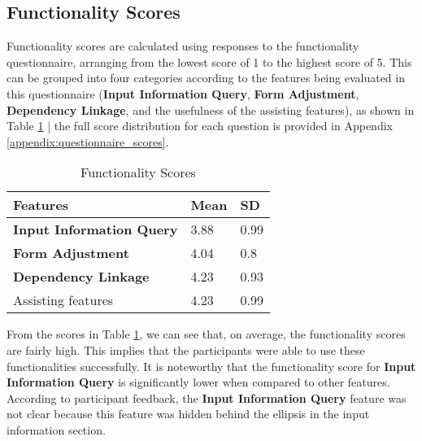 
\subsection{Functionality Scores}
\label{eval:func_scores}
Functionality scores are calculated using responses to the functionality questionnaire, arranging from the lowest score of 1 to the highest score of 5. This can be grouped into four categories according to the features being evaluated in this questionnaire (\textbf{Input Information Query}, \textbf{Form Adjustment}, \textbf{Dependency Linkage}, and the usefulness of the assisting features), as shown in Table \ref{tab:func_scores} | the full score distribution for each question is provided in Appendix \ref{appendix:questionnaire_scores}.


\begin{table}[ht!]
    \centering
    \footnotesize
    \begin{tabular}{
      |p{}%
      |p{}%
      |p{}|%
      }
      \hline
      \centering Features & \centering Mean & \centering\arraybackslash SD    \\ \hline
      \hfil \textbf{Input Information Query} & \hfil 3.88 & \hfil 0.99 \\ \hline
      \hfil \textbf{Form Adjustment} & \hfil 4.04 & \hfil 0.8 \\ \hline
      \hfil \textbf{Dependency Linkage} & \hfil 4.23 & \hfil 0.93 \\ \hline
      \hfil Assisting features & \hfil 4.23 & \hfil 0.99 \\ \hline
    \end{tabular}
    \caption{Functionality Scores}
    \label{tab:func_scores}
\end{table}

From the scores in Table \ref{tab:func_scores}, we can see that, on average, the functionality scores are fairly high. This implies that the participants were able to use these functionalities successfully.
It is noteworthy that the functionality score for \textbf{Input Information Query} is significantly lower when compared to other features. According to participant feedback, the \textbf{Input Information Query} feature was not clear because this feature was hidden behind the ellipsis in the input information section.

